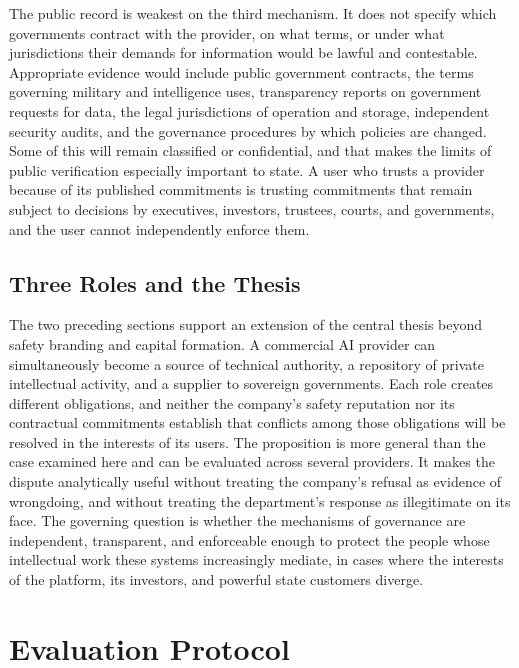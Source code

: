 \documentclass[12pt]{article}
\theoremstyle{definition}
\theoremstyle{remark}
\begin{document}
The public record is weakest on the third mechanism. It does not specify which governments contract with the provider, on what terms, or under what jurisdictions their demands for information would be lawful and contestable. Appropriate evidence would include public government contracts, the terms governing military and intelligence uses, transparency reports on government requests for data, the legal jurisdictions of operation and storage, independent security audits, and the governance procedures by which policies are changed. Some of this will remain classified or confidential, and that makes the limits of public verification especially important to state. A user who trusts a provider because of its published commitments is trusting commitments that remain subject to decisions by executives, investors, trustees, courts, and governments, and the user cannot independently enforce them.

\subsection{Three Roles and the Thesis}

The two preceding sections support an extension of the central thesis beyond safety branding and capital formation. A commercial AI provider can simultaneously become a source of technical authority, a repository of private intellectual activity, and a supplier to sovereign governments. Each role creates different obligations, and neither the company's safety reputation nor its contractual commitments establish that conflicts among those obligations will be resolved in the interests of its users. The proposition is more general than the case examined here and can be evaluated across several providers. It makes the dispute analytically useful without treating the company's refusal as evidence of wrongdoing, and without treating the department's response as illegitimate on its face. The governing question is whether the mechanisms of governance are independent, transparent, and enforceable enough to protect the people whose intellectual work these systems increasingly mediate, in cases where the interests of the platform, its investors, and powerful state customers diverge.

\section{Evaluation Protocol}
\end{document}
